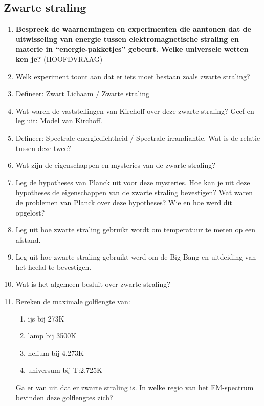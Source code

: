 \documentclass[a4paper,12pt]{article}
\begin{document}
    \subsection{Zwarte straling}
    \begin{enumerate}
        \item \textbf{Bespreek de waarnemingen en experimenten die aantonen dat de uitwisseling van energie tussen elektromagnetische straling en materie in “energie-pakketjes” gebeurt. Welke universele wetten ken je?} (HOOFDVRAAG)
        \item Welk experiment toont aan dat er iets moet bestaan zoals zwarte straling?
        \item Defineer: Zwart Lichaam / Zwarte straling
        \item Wat waren de vaststellingen van Kirchoff over deze zwarte straling? Geef en leg uit: Model van Kirchoff.
        \item Defineer: Spectrale energiedichtheid / Spectrale irrandiantie. Wat is de relatie tussen deze twee?
        \item Wat zijn de eigenschappen en mysteries van de zwarte straling?
        \item Leg de hypotheses van Planck uit voor deze mysteries. Hoe kan je uit deze hypotheses de eigenschappen van de zwarte straling bevestigen? Wat waren de problemen van Planck over deze hypotheses? Wie en hoe werd dit opgelost?
        \item Leg uit hoe zwarte straling gebruikt wordt om temperatuur te meten op een afstand.
        \item Leg uit hoe zwarte straling gebruikt werd om de Big Bang en uitdeiding van het heelal te bevestigen.
        \item Wat is het algemeen besluit over zwarte straling?

        \item Bereken de maximale golflengte van:
            \begin{enumerate}
                \item ijs bij 273K
                \item lamp bij 3500K
                \item helium bij 4.273K
                \item universum bij T:2.725K
            \end{enumerate}
            Ga er van uit dat er zwarte straling is. In welke regio van het EM-spectrum bevinden deze golflengtes zich?
    \end{enumerate}
\end{document}
